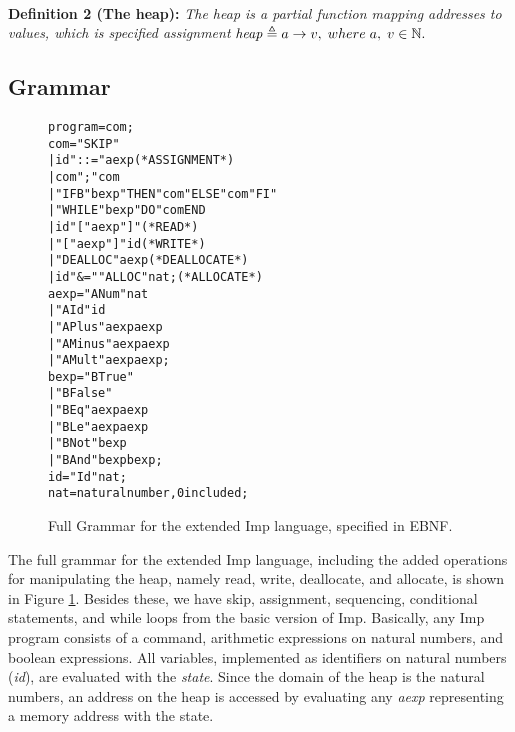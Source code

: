 \paragraph{}
\textbf{Definition 2 (The heap):} \textit{The heap is a partial function mapping addresses to values, which is specified assignment} $\mathit{heap} \mathrel{\triangleq} a\to v, \; where\; a, \;v \in \mathbb{N}.$

\subsection{Grammar}

\begin{figure}
\begin{alltt}
                  program = com ;
                  com =   "SKIP"
                        | id "::=" aexp            (* ASSIGNMENT *)
                        | com ";" com
                        | "IFB" bexp "THEN" com "ELSE" com "FI"
                        | "WHILE" bexp "DO" com END
                        | id \lsquigarr "[" aexp "]"       (* READ *)
                        | "[" aexp "]" \lsquigarr id       (* WRITE *)
                        | "DEALLOC" aexp           (* DEALLOCATE *)
                        | id "&=" "ALLOC" nat ;    (* ALLOCATE *)
                  aexp =  "ANum" nat
                        | "AId" id
                        | "APlus" aexp aexp
                        | "AMinus" aexp aexp
                        | "AMult" aexp aexp ;
                  bexp =  "BTrue"
                        | "BFalse"
                        | "BEq" aexp aexp
                        | "BLe" aexp aexp
                        | "BNot" bexp
                        | "BAnd" bexp bexp ;
                  id = "Id" nat ;
                  nat = natural number, 0 included ;
\end{alltt}
\caption{Full Grammar for the extended Imp language, specified in EBNF.}
\label{fig:imp_grammar}
\end{figure}

The full grammar for the extended Imp language, including the added operations for manipulating the heap, namely read, write, deallocate, and allocate, is shown in Figure \ref{fig:imp_grammar}. Besides these, we have skip, assignment, sequencing, conditional statements, and while loops from the basic version of Imp. Basically, any Imp program consists of a command, arithmetic expressions on natural numbers, and boolean expressions. All variables, implemented as identifiers on natural numbers ({\it id}), are evaluated with the {\it state}. Since the domain of the heap is the natural numbers, an address on the heap is accessed by evaluating any {\it aexp} representing a memory address with the state.

